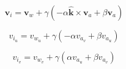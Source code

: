 \documentclass[12pt]{article}
\begin{document}
\begin{equation}
\textbf{v}_i = \textbf{v}_w + \gamma(-\alpha \boldsymbol{\hat{k}} \times
               \textbf{v}_a + \beta \textbf{v}_a)
\end{equation}

\begin{equation}
v_{i_u} = v_{w_u} + \gamma(-\alpha v_{a_v} + \beta v_{a_u})
\end{equation}

\begin{equation}
v_{i_v} = v_{w_v} + \gamma(\alpha v_{a_u} + \beta v_{a_v})
\end{equation}
\end{document}
